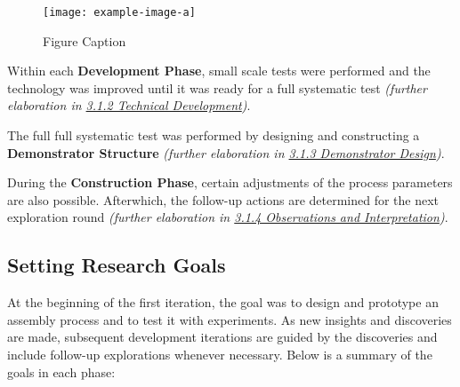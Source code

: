 \begin{figure}
    \centering
    \texttt{[image: example-image-a]}
    \caption{Figure Caption}
\end{figure}

Within each \textbf{Development Phase}, small scale tests were performed and the technology was improved until it was ready for a full systematic test \textit{(further elaboration in \ul{3.1.2 Technical Development})}. 

The full full systematic test was performed by designing and constructing a \textbf{Demonstrator Structure} \textit{(further elaboration in \ul{3.1.3 Demonstrator Design})}. 

During the \textbf{Construction Phase}, certain adjustments of the process parameters are also possible. Afterwhich, the follow-up actions are determined for the next exploration round\textbf{ }\textit{(further elaboration in \ul{3.1.4 Observations and Interpretation})}.

\subsection{Setting Research Goals}

At the beginning of the first iteration, the goal was to design and prototype an assembly process and to test it with experiments. As new insights and discoveries are made, subsequent development iterations are guided by the discoveries and include follow-up explorations whenever necessary. Below is a summary of the goals in each phase:

